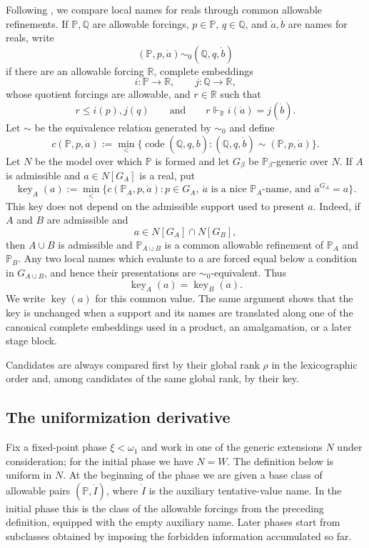 \documentclass[a4paper,11pt]{article}
\newcommand{\forceP}{\mathbb{P}}
\newcommand{\forceQ}{\mathbb{Q}}
\newcommand{\forceR}{\mathbb{R}}
\begin{document}
Following \cite{Uniformization}, we compare local names for reals through common allowable refinements. If $\forceP,\forceQ$ are allowable forcings, $p\in\forceP$, $q\in\forceQ$, and $\dot a,\dot b$ are names for reals, write
\[
(\forceP,p,\dot a)\sim_0(\forceQ,q,\dot b)
\]
if there are an allowable forcing $\forceR$, complete embeddings
\[
i:\forceP\longrightarrow\forceR,
\qquad
j:\forceQ\longrightarrow\forceR,
\]
whose quotient forcings are allowable, and $r\in\forceR$ such that
\[
r\leq i(p),j(q)
\qquad\text{and}\qquad
r\Vdash_{\forceR}i(\dot a)=j(\dot b).
\]
Let $\sim$ be the equivalence relation generated by $\sim_0$ and define
\[
c(\forceP,p,\dot a)
:=\min_{<}\{\operatorname{code}(\forceQ,q,\dot b):
(\forceQ,q,\dot b)\sim(\forceP,p,\dot a)\}.
\]
Let $N$ be the model over which $\forceP$ is formed and let $G_\beta$ be $\forceP_\beta$-generic over $N$. If $A$ is admissible and $a\in N[G_A]$ is a real, put
\[
\operatorname{key}_A(a)
:=\min_{<}\{c(\forceP_A,p,\dot a):
 p\in G_A,\ \dot a\text{ is a nice $\forceP_A$-name, and }
 \dot a^{G_A}=a\}.
\]
This key does not depend on the admissible support used to present $a$. Indeed, if $A$ and $B$ are admissible and
\[
a\in N[G_A]\cap N[G_B],
\]
then $A\cup B$ is admissible and $\forceP_{A\cup B}$ is a common allowable refinement of $\forceP_A$ and $\forceP_B$. Any two local names which evaluate to $a$ are forced equal below a condition in $G_{A\cup B}$, and hence their presentations are $\sim_0$-equivalent. Thus
\[
\operatorname{key}_A(a)=\operatorname{key}_B(a).
\]
We write $\operatorname{key}(a)$ for this common value. The same argument shows that the key is unchanged when a support and its names are translated along one of the canonical complete embeddings used in a product, an amalgamation, or a later stage block.

Candidates are always compared first by their global rank $\rho$ in the lexicographic order and, among candidates of the same global rank, by their key.

\subsection{The uniformization derivative}\label{UniformizationDerivative}

Fix a fixed-point phase $\xi<\omega_1$ and work in one of the generic extensions $N$ under consideration; for the initial phase we have $N=W$. The definition below is uniform in $N$. At the beginning of the phase we are given a base class of allowable pairs $(\forceP,\dot I)$, where $\dot I$ is the auxiliary tentative-value name. In the initial phase this is the class of the allowable forcings from the preceding definition, equipped with the empty auxiliary name. Later phases start from subclasses obtained by imposing the forbidden information accumulated so far.
\end{document}
